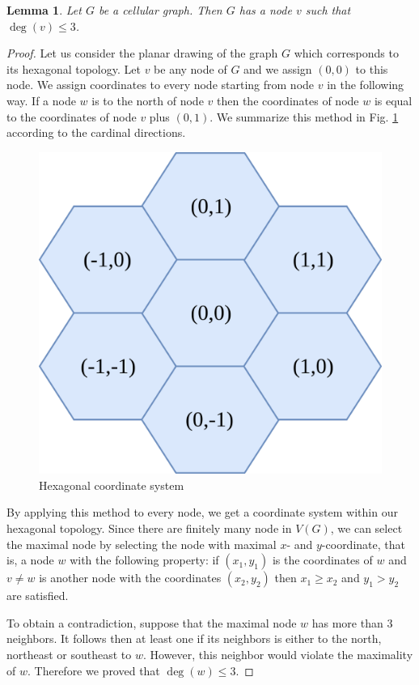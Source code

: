 \documentclass[a4paper, 12pt]{article}
\newtheorem{lem}{Lemma}[section]
\begin{document}

\begin{lem}\label{lem:degree-constraint}
Let $G$ be a cellular graph. Then $G$ has a node $v$ such that $\deg(v) \leqslant 3$.
\end{lem}

\begin{proof} Let us consider the planar drawing of the graph $G$ which corresponds to its hexagonal topology.
Let $v$ be any node of $G$ and we assign $(0,0)$ to this node. We assign coordinates to every node starting from node $v$ in the following way. If a node $w$ is to the north of node $v$ then the coordinates of node $w$ is equal to the coordinates of node $v$ plus $(0,1)$. We summarize this method in Fig. \ref{fig:assignment} according to the cardinal directions.
\begin{figure}[!h]
\centering
\includegraphics[scale=0.15]{figures/hexagonal-coordinate-system.png}
\caption{Hexagonal coordinate system}\label{fig:assignment}
\end{figure}
By applying this method to every node, we get a coordinate system within our hexagonal topology. Since there are finitely many node in $V(G)$, we can select the maximal node by selecting the node with maximal $x$- and $y$-coordinate, that is, a node $w$ with the following property: if $(x_1,y_1)$ is the coordinates of $w$ and $v \neq w$ is another node with the coordinates $(x_2,y_2)$ then $x_1 \geqslant x_2$ and $y_1 > y_2$ are satisfied.

To obtain a contradiction, suppose that the maximal node $w$ has more than 3 neighbors. It follows then at least one if its neighbors is either to the north, northeast or southeast to $w$. However, this neighbor would violate the maximality of $w$. Therefore we proved that $\deg(w) \leqslant 3$.
\end{proof}
\end{document}
